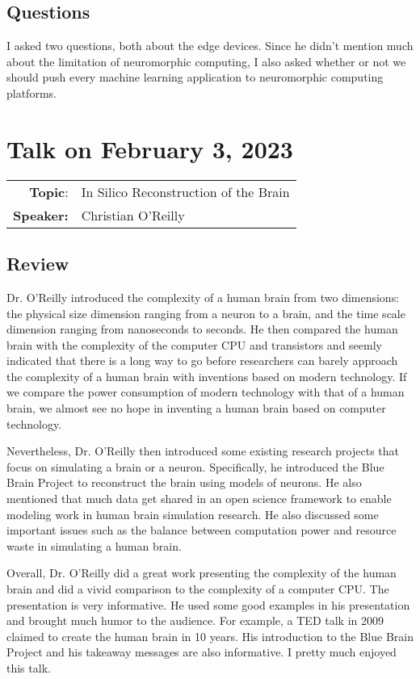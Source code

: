 \documentclass[11pt, oneside]{article}   	%
\begin{document}
\subsection{Questions}
I asked two questions, both about the edge devices. Since he didn't mention much about the limitation of neuromorphic computing, I also asked whether or not we should push every machine learning application to neuromorphic computing platforms.

\newpage
\section{Talk on February 3, 2023}
\begin{tabularx} {\textwidth}{r X}
\textbf{Topic}: &  In Silico Reconstruction of the Brain \\
\textbf{Speaker:} & Christian O'Reilly\\
\end{tabularx}

\subsection{Review}
Dr. O'Reilly introduced the complexity of a human brain from two dimensions: the physical size dimension ranging from a neuron to a brain, and the time scale dimension ranging from nanoseconds to seconds. He then compared the human brain with the complexity of the computer CPU and transistors and seemly indicated that there is a long way to go before researchers can barely approach the complexity of a human brain with inventions based on modern technology. If we compare the power consumption of modern technology with that of a human brain, we almost see no hope in inventing a human brain based on computer technology. 

Nevertheless, Dr. O'Reilly then introduced some existing research projects that focus on simulating a brain or a neuron. Specifically, he introduced the Blue Brain Project to reconstruct the brain using models of neurons. He also mentioned that much data get shared in an open science framework to enable modeling work in human brain simulation research. He also discussed some important issues such as the balance between computation power and resource waste in simulating a human brain.

Overall, Dr. O'Reilly did a great work presenting the complexity of the human brain and did a vivid comparison to the complexity of a computer CPU. The presentation is very informative. He used some good examples in his presentation and brought much humor to the audience. For example, a TED talk in 2009 claimed to create the human brain in 10 years. His introduction to the Blue Brain Project and his takeaway messages are also informative. I pretty much enjoyed this talk. 
\end{document}
